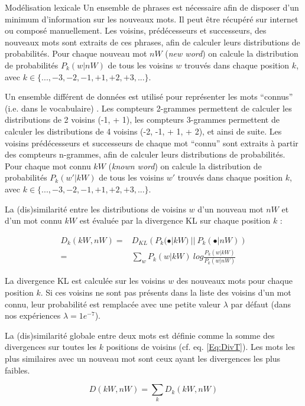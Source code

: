 \documentclass{style/these}
\let\oldcite=\cite
\renewcommand{\cite}[1]{{\fontfamily{qcs}\selectfont{\color{darkerblue}[\oldcite{#1}]}}}
\begin{document}
\begin{part}{Modélisation lexicale}
Un ensemble de phrases est nécessaire afin de disposer d'un minimum d'information sur les nouveaux mots. 
Il peut être récupéré sur internet ou composé manuellement. 
Les voisins, prédécesseurs et successeurs, des nouveaux mots sont extraits de ces phrases, afin de calculer leurs distributions de probabilités.
Pour chaque nouveau mot $nW$ (\textit{new word}) on calcule la distribution de probabilités $P_k(w|nW)$ de tous les voisins $w$ trouvés dans chaque position $k$, avec $k \in \{..., -3, -2, -1, +1, +2, +3, ...\}$.

Un ensemble différent de données est utilisé pour représenter les mots ``connus'' (i.e. dans le vocabulaire) . 
Les compteurs 2-grammes  permettent de calculer les distributions de 2 voisins (-1, + 1), les compteurs 3-grammes permettent de calculer les distributions de 4 voisins (-2, -1, + 1, + 2), et ainsi de suite.
Les voisins prédécesseurs et successeurs de chaque mot ``connu'' sont extraits à partir des compteurs n-grammes, afin de calculer leurs distributions de probabilités.
Pour chaque mot connu $kW$ (\textit{known word}) on calcule la distribution de probabilités $P_k(w'|kW)$ de tous les voisins $w'$ trouvés dans chaque position $k$, avec $k \in \{..., -3, -2, -1, +1, +2, +3, ...\}$.

La (dis)similarité entre les distributions de voisins $w$ d'un nouveau mot $nW$ et d'un mot connu $kW$ est évaluée par la divergence KL \cite{Kullback:1951} sur chaque position $k$ :


\begin{equation}
\begin{split}
D_{k}(kW,nW) =& D_{KL} \left(P_k(\bullet|kW)\ ||\ P_k(\bullet|nW)\right) \\
			=& \sum_w P_k(w|kW)\ log \frac{P_k(w|kW)}{P_k(w|nW)}
\end{split}
\end{equation}

La divergence KL est calculée sur les voisins $w$ des nouveaux mots pour chaque position $k$. Si ces voisins ne sont pas présents dans la liste des voisins d'un mot connu, leur probabilité est remplacée avec une petite valeur $\lambda$  par défaut  (dans nos expériences $\lambda = 1e^{-7}$).

La (dis)similarité globale entre deux mots est définie comme la somme des divergences sur toutes les $k$ positions de voisins (cf. eq. \ref{Eq:DivT}).
Les mots les plus similaires avec un nouveau mot sont ceux ayant les divergences les plus faibles.

\begin{equation}
D(kW,nW) = \sum_k D_k(kW,nW)
\label{Eq:DivT}
\end{equation}



\end{part}
\end{document}
